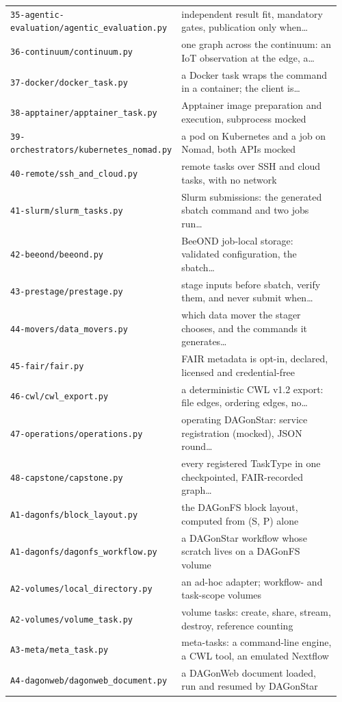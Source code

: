 {\begin{longtable}{@{}p{0.43\linewidth}p{0.53\linewidth}@{}}
\texttt{35-agentic-evaluation/agentic\_evaluation.py} & independent result fit, mandatory gates, publication only when\ldots \\
\texttt{36-continuum/continuum.py} & one graph across the continuum: an IoT observation at the edge, a\ldots \\
\texttt{37-docker/docker\_task.py} & a Docker task wraps the command in a container; the client is\ldots \\
\texttt{38-apptainer/apptainer\_task.py} & Apptainer image preparation and execution, subprocess mocked \\
\texttt{39-orchestrators/kubernetes\_nomad.py} & a pod on Kubernetes and a job on Nomad, both APIs mocked \\
\texttt{40-remote/ssh\_and\_cloud.py} & remote tasks over SSH and cloud tasks, with no network \\
\texttt{41-slurm/slurm\_tasks.py} & Slurm submissions: the generated sbatch command and two jobs run\ldots \\
\texttt{42-beeond/beeond.py} & BeeOND job-local storage: validated configuration, the sbatch\ldots \\
\texttt{43-prestage/prestage.py} & stage inputs before sbatch, verify them, and never submit when\ldots \\
\texttt{44-movers/data\_movers.py} & which data mover the stager chooses, and the commands it generates\ldots \\
\texttt{45-fair/fair.py} & FAIR metadata is opt-in, declared, licensed and credential-free \\
\texttt{46-cwl/cwl\_export.py} & a deterministic CWL v1.2 export: file edges, ordering edges, no\ldots \\
\texttt{47-operations/operations.py} & operating DAGonStar: service registration (mocked), JSON round\ldots \\
\texttt{48-capstone/capstone.py} & every registered TaskType in one checkpointed, FAIR-recorded graph\ldots \\
\texttt{A1-dagonfs/block\_layout.py} & the DAGonFS block layout, computed from (S, P) alone \\
\texttt{A1-dagonfs/dagonfs\_workflow.py} & a DAGonStar workflow whose scratch lives on a DAGonFS volume \\
\texttt{A2-volumes/local\_directory.py} & an ad-hoc adapter; workflow- and task-scope volumes \\
\texttt{A2-volumes/volume\_task.py} & volume tasks: create, share, stream, destroy, reference counting \\
\texttt{A3-meta/meta\_task.py} & meta-tasks: a command-line engine, a CWL tool, an emulated Nextflow \\
\texttt{A4-dagonweb/dagonweb\_document.py} & a DAGonWeb document loaded, run and resumed by DAGonStar \\
\bottomrule
\end{longtable}
}

